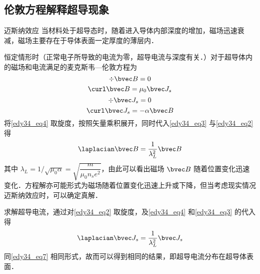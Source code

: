 \subsection{伦敦方程解释超导现象}
\begin{theorem}{迈斯纳效应}
当材料处于超导态时，随着进入导体内部深度的增加，磁场迅速衰减，磁场主要存在于导体表面一定厚度的薄层内．
\end{theorem}
恒定情形时（正常电子所导致的电流为零，超导电流与深度有关．）对于超导体内的磁场和电流满足的麦克斯韦—伦敦方程为
\begin{equation}
\div \bvec B=0\label{edy34_eq3}
\end{equation}
\begin{equation}
\curl \bvec B=\mu_0 \bvec J_s\label{edy34_eq4}
\end{equation}
\begin{equation}
\div \bvec J_s=0\label{edy34_eq5}
\end{equation}
\begin{equation}
\curl \bvec J_s=-\alpha\bvec B
\end{equation}
将\autoref{edy34_eq4} 取旋度，按照矢量乘积展开，同时代入\autoref{edy34_eq3} 与\autoref{edy34_eq2} 得
\begin{equation}
\laplacian \bvec B=\dfrac{1}{\lambda_L^2}\bvec B \label{edy34_eq7}
\end{equation}
其中 $\lambda_L= 1/\sqrt{\mu_0\alpha}=\sqrt{\dfrac m {\mu_0n_se^2}}$，由此可以看出磁场 $\bvec B$ 随着位置变化迅速变化．方程解亦可能形式为磁场随着位置变化迅速上升或下降，但当考虑现实情况迈斯纳效应时，可以确定真解．

求解超导电流，通过对\autoref{edy34_eq2} 取旋度，及\autoref{edy34_eq4} 和\autoref{edy34_eq3} 的代入得
\begin{equation}
\laplacian\bvec J_s=\dfrac 1 {\lambda_L^2}\bvec J_s
\end{equation}
同\autoref{edy34_eq7} 相同形式，故而可以得到相同的结果，即超导电流分布在超导体表面．
